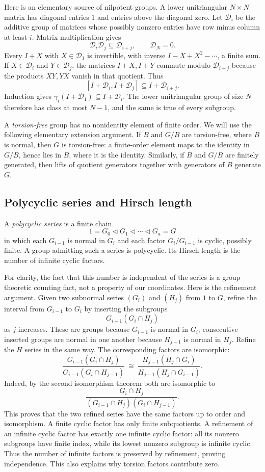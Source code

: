 \documentclass[11pt]{article}
\numberwithin{equation}{section}
\theoremstyle{definition}
\theoremstyle{remark}
\begin{document}
Here is an elementary source of nilpotent groups. A lower unitriangular $N\times N$ matrix has diagonal entries $1$ and entries above the diagonal zero. Let $\mathcal D_i$ be the additive group of matrices whose possibly nonzero entries have row minus column at least $i$. Matrix multiplication gives
\[
\mathcal D_i\mathcal D_j\subseteq\mathcal D_{i+j},\qquad \mathcal D_N=0.
\]
Every $I+X$ with $X\in\mathcal D_1$ is invertible, with inverse $I-X+X^2-\cdots$, a finite sum. If $X\in\mathcal D_i$ and $Y\in\mathcal D_j$, the matrices $I+X,I+Y$ commute modulo $\mathcal D_{i+j}$ because the products $XY,YX$ vanish in that quotient. Thus
\[
[I+\mathcal D_i,I+\mathcal D_j]\subseteq I+\mathcal D_{i+j}.
\]
Induction gives $\gamma_i(I+\mathcal D_1)\subseteq I+\mathcal D_i$. The lower unitriangular group of size $N$ therefore has class at most $N-1$, and the same is true of every subgroup.

A \emph{torsion-free} group has no nonidentity element of finite order. We will use the following elementary extension argument. If $B$ and $G/B$ are torsion-free, where $B$ is normal, then $G$ is torsion-free: a finite-order element maps to the identity in $G/B$, hence lies in $B$, where it is the identity. Similarly, if $B$ and $G/B$ are finitely generated, then lifts of quotient generators together with generators of $B$ generate $G$.

\subsection{Polycyclic series and Hirsch length}\label{subsec:hirsch}
A \emph{polycyclic series} is a finite chain
\[
1=G_0\triangleleft G_1\triangleleft\cdots\triangleleft G_a=G
\]
in which each $G_{i-1}$ is normal in $G_i$ and each factor $G_i/G_{i-1}$ is cyclic, possibly finite. A group admitting such a series is polycyclic. Its Hirsch length is the number of infinite cyclic factors.

For clarity, the fact that this number is independent of the series is a group-theoretic counting fact, not a property of our coordinates. Here is the refinement argument. Given two subnormal series $(G_i)$ and $(H_j)$ from $1$ to $G$, refine the interval from $G_{i-1}$ to $G_i$ by inserting the subgroups
\[
G_{i-1}(G_i\cap H_j)
\]
as $j$ increases. These are groups because $G_{i-1}$ is normal in $G_i$; consecutive inserted groups are normal in one another because $H_{j-1}$ is normal in $H_j$. Refine the $H$ series in the same way. The corresponding factors are isomorphic:
\[
\frac{G_{i-1}(G_i\cap H_j)}{G_{i-1}(G_i\cap H_{j-1})}
\ \cong\
\frac{H_{j-1}(H_j\cap G_i)}{H_{j-1}(H_j\cap G_{i-1})}.
\]
Indeed, by the second isomorphism theorem both are isomorphic to
\[
\frac{G_i\cap H_j}{(G_{i-1}\cap H_j)(G_i\cap H_{j-1})}.
\]
This proves that the two refined series have the same factors up to order and isomorphism. A finite cyclic factor has only finite subquotients. A refinement of an infinite cyclic factor has exactly one infinite cyclic factor: all its nonzero subgroups have finite index, while its lowest nonzero subgroup is infinite cyclic. Thus the number of infinite factors is preserved by refinement, proving independence. This also explains why torsion factors contribute zero.
\end{document}
